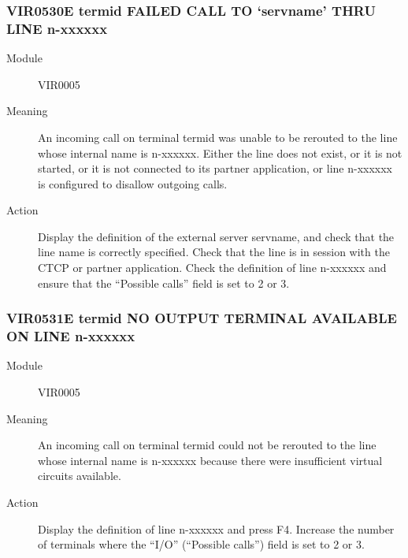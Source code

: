 \documentclass[letterpaper,10pt,english]{sphinxmanual}
\begin{document}
\subsubsection{VIR0530E termid FAILED CALL TO ‘servname’ THRU LINE n-xxxxxx}
\label{\detokenize{messages:vir0530e-termid-failed-call-to-servname-thru-line-n-xxxxxx}}\begin{description}
\item[{Module}] \leavevmode
VIR0005

\item[{Meaning}] \leavevmode
An incoming call on terminal termid was unable to be rerouted to the line whose internal name is n-xxxxxx. Either the line does not exist, or it is not started, or it is not connected to its partner application, or line n-xxxxxx is configured to disallow outgoing calls.

\item[{Action}] \leavevmode
Display the definition of the external server servname, and check that the line name is correctly specified. Check that the line is in session with the CTCP or partner application. Check the definition of line n-xxxxxx and ensure that the “Possible calls” field is set to 2 or 3.

\end{description}


\subsubsection{VIR0531E termid NO OUTPUT TERMINAL AVAILABLE ON LINE n-xxxxxx}
\label{\detokenize{messages:vir0531e-termid-no-output-terminal-available-on-line-n-xxxxxx}}\begin{description}
\item[{Module}] \leavevmode
VIR0005

\item[{Meaning}] \leavevmode
An incoming call on terminal termid could not be rerouted to the line whose internal name is n-xxxxxx because there were insufficient virtual circuits available.

\item[{Action}] \leavevmode
Display the definition of line n-xxxxxx and press F4. Increase the number of terminals where the “I/O” (“Possible calls”) field is set to 2 or 3.

\end{description}
\end{document}
